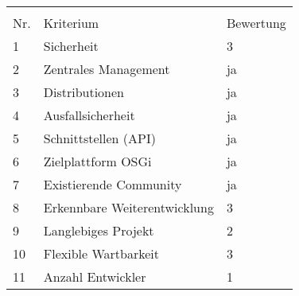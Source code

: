 \begin{table}[H]
\begin{framed}
\begin{tabular}{l|l|l|l}
  \multicolumn{4}{l}{} \\
  
  Nr. &  \multicolumn{2}{l|}{Kriterium} & Bewertung \\
  \midrule
  1 & \multicolumn{2}{l|}{Sicherheit}
  & 3 \\
  
  2 & \multicolumn{2}{l|}{Zentrales Management}
  & ja \\
  
  3 & \multicolumn{2}{l|}{Distributionen}
  & ja \\
  
  4 & \multicolumn{2}{l|}{Ausfallsicherheit}
  & ja \\
  
  5 & \multicolumn{2}{l|}{Schnittstellen (\ac{API})}
  & ja \\

  6 & \multicolumn{2}{l|}{Zielplattform OSGi}
  & ja \\
  
  7 & \multicolumn{2}{l|}{Existierende Community}
  & ja \\
  
  8 & \multicolumn{2}{l|}{Erkennbare Weiterentwicklung}
  & 3 \\
  
  9 & \multicolumn{2}{l|}{Langlebiges Projekt}
  & 2 \\
  
  10 & \multicolumn{2}{l|}{Flexible Wartbarkeit}
  & 3 \\
  
  11 & \multicolumn{2}{l|}{Anzahl Entwickler}
  & 1 \\
  \bottomrule
 \end{tabular}
 \label{tab:rating_ace}
 \end{framed}
\end{table}


